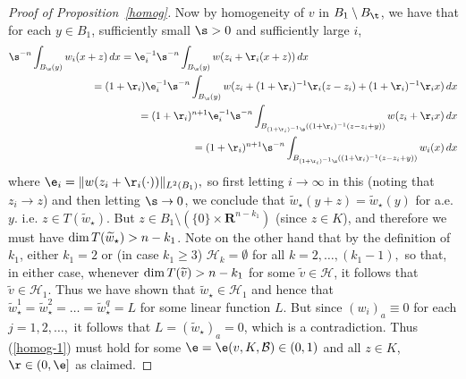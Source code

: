 \documentclass[a4paper,11pt]{amsart}
\begin{document}
\begin{proof}[Proof of Proposition~\ref{homog}]
Now by homogeneity of $v$ in $B_{1} \setminus B_{\t}$, we have that for each $y \in B_{1}$, sufficiently small $\s>0$ and sufficiently large $i$, 
\begin{eqnarray*}
\s^{-n}\int_{B_{\s}(y)} w_{i}(x + z) \,dx = \e_{i}^{-1}\s^{-n}\int_{B_{\s}(y)} w(z_{i} + \r_{i}(x + z)) \, dx&&\nonumber\\
&&\hspace{-3in}=(1 + \r_{i})\e_{i}^{-1}\s^{-n}\int_{B_{\s}(y)} w(z_{i} +(1 + \r_{i})^{-1}\r_{i}(z - z_{i}) + (1+ \r_{i})^{-1}\r_{i}x) \, dx\nonumber\\
&&\hspace{-3in}=(1 + \r_{i})^{n+1} \e_{i}^{-1}\s^{-n}\int_{B_{(1+\r_{i})^{-1}\s}((1+\r_{i})^{-1}(z-z_{i}+y))}w(z_{i} + \r_{i}x)\, dx\nonumber\\
&&\hspace{-3in}= (1+\r_{i})^{n+1}\s^{-n}\int_{B_{(1+\r_{i})^{-1}\s}((1+\r_{i})^{-1}(z-z_{i}+y))} w_{i}(x) \, dx
\end{eqnarray*}
where $\e_{i} = \|w(z_{i} + \r_{i}(\cdot))\|_{L^{2}(B_{1})},$ so first letting $i \to \infty$ in this (noting that 
$z_{i} \to z$) and then letting $\s \to 0$, 
we conclude that $\widetilde{w}_{\star}(y + z) = \widetilde{w}_{\star}(y)$ for a.e. $y$. i.e. 
$z \in T(\widetilde{w}_{\star}).$ But $z \in B_{1} \setminus \left(\{0\} \times {\mathbf R}^{n-k_{1}}\right)$ (since $z \in K$), and therefore we must have  
${\rm dim} \, T(\widetilde{w}_{\star}) > n-k_{1}$.  Note on the other hand that by the definition of $k_{1}$, either $k_{1} = 2$ or (in case $k_{1} \geq 3$) 
${\mathcal H}_{k}  =\emptyset$ for all $k=2, \ldots, (k_{1}-1),$ so that, in either case, whenever ${\rm dim} \, T(\widetilde{v}) > n- k_{1}$ for some $\widetilde{v} \in {\mathcal H}$, it follows that $\widetilde{v} \in {\mathcal H}_{1}.$ Thus we have shown that 
$\widetilde{w}_{\star} \in {\mathcal H}_{1}$ and hence that
$\widetilde{w}_{\star}^{1} = \widetilde{w}_{\star}^{2} =\ldots = \widetilde{w}_{\star}^{q} = L$ for some linear function $L$. But since $(w_{i})_{a} \equiv 0$ for each $j=1, 2, \ldots,$ it follows that 
$L = (\widetilde{w}_{\star})_{a} = 0$, which is a contradiction. Thus (\ref{homog-1}) must hold 
for some $\e = \e(v, K, {\mathcal B}) \in (0, 1)$ and all $z \in K$, $\r \in (0, \e]$ as claimed.


\end{proof}
\end{document}
